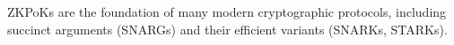 \begin{remark}
ZKPoKs are the foundation of many modern cryptographic protocols, including succinct
arguments (SNARGs) and their efficient variants (SNARKs, STARKs).
\end{remark}



